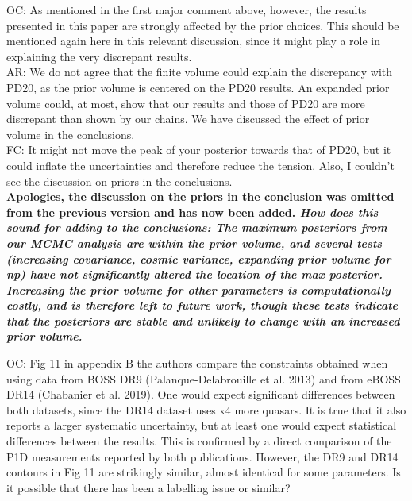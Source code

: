 \documentclass[12pt]{article}
\begin{document}
OC: As mentioned in the first major comment above, however, the results presented in this paper are strongly affected by the prior choices. This should be mentioned again here in this relevant discussion, since it might play a role in explaining the very discrepant results.\\

AR: We do not agree that the finite volume could explain the discrepancy with PD20, as the prior volume is centered on the PD20 results. An expanded prior volume could, at most, show that our results and those of PD20 are more discrepant than shown by our chains. We have discussed the effect of prior volume in the conclusions.\\

FC: It might not move the peak of your posterior towards that of PD20, but it could inflate the uncertainties and therefore reduce the tension. Also, I couldn’t see the discussion on priors in the conclusions.\\

\textbf{Apologies, the discussion on the priors in the conclusion was omitted from the previous version and has now been added. \textit{How does this sound for adding to the conclusions: The maximum posteriors from our MCMC analysis are within the prior volume, and several tests (increasing covariance, cosmic variance, expanding prior volume for np) have not significantly altered the location of the max posterior. Increasing the prior volume for other parameters is computationally costly, and is therefore left to future work, though these tests indicate that the posteriors are stable and unlikely to change with an increased prior volume.}}\\

\hrulefill \newline

OC: Fig 11 in appendix B the authors compare the constraints obtained when using data from BOSS DR9 (Palanque-Delabrouille et al. 2013) and from eBOSS DR14 (Chabanier et al. 2019). One would expect significant differences between both datasets, since the DR14 dataset uses x4 more quasars. It is true that it also reports a larger systematic uncertainty, but at least one would expect statistical differences between the results. This is confirmed by a direct comparison of the P1D measurements reported by both publications. However, the DR9 and DR14 contours in Fig 11 are strikingly similar, almost identical for some parameters. Is it possible that there has been a labelling issue or similar?\\
\end{document}
